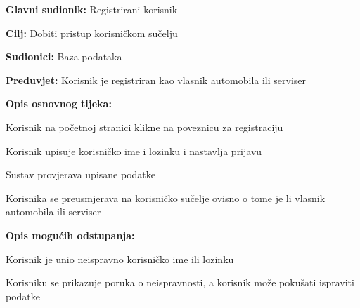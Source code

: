 \noindent {}
\begin{packed_item}
	
	\item \textbf{Glavni sudionik: } Registrirani korisnik
	\item  \textbf{Cilj:} Dobiti pristup korisničkom sučelju
	\item  \textbf{Sudionici:} Baza podataka
	\item  \textbf{Preduvjet:} Korisnik je registriran kao vlasnik automobila
	ili serviser
	\item  \textbf{Opis osnovnog tijeka:}
	
	\item[] \begin{packed_enum}
		
		\item Korisnik na početnoj stranici klikne na poveznicu za registraciju
		\item Korisnik upisuje korisničko ime i lozinku i nastavlja prijavu
		\item Sustav provjerava upisane podatke
		\item Korisnika se preusmjerava na korisničko sučelje ovisno o tome je li
		vlasnik automobila ili serviser
	\end{packed_enum}
	
	\item  \textbf{Opis mogućih odstupanja:}
	
	\item[] \begin{packed_item}
		
		\item[3.a] Korisnik je unio neispravno korisničko ime ili lozinku
		\item[] \begin{packed_enum}
			
			\item Korisniku se prikazuje poruka o neispravnosti, a korisnik može
			pokušati ispraviti podatke
			
		\end{packed_enum}
		
	\end{packed_item}
\end{packed_item}

